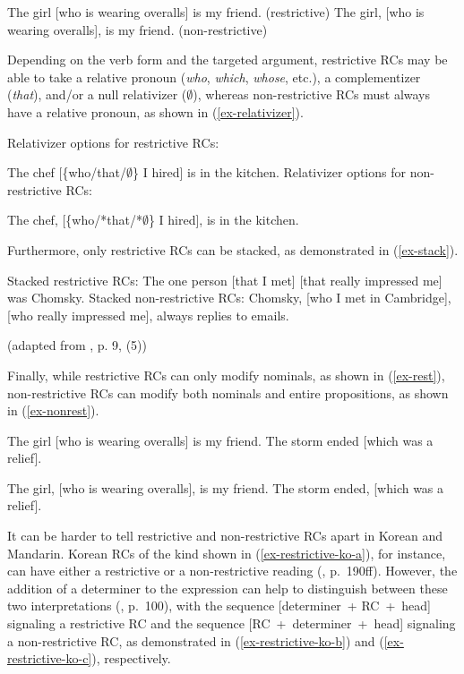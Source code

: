 \pex
\a The girl [who is wearing overalls] is my friend. (restrictive) \label{ex-prosody-a}
\a The girl, [who is wearing overalls], is my friend. (non-restrictive)\label{ex-prosody-b}
\xe

\noindent Depending on the verb form and the targeted argument, restrictive RCs may be able to take a relative pronoun (\textit{who}, \textit{which}, \textit{whose}, etc.), a complementizer (\textit{that}), and/or a null relativizer ($\emptyset$), whereas non-restrictive RCs must always have a relative pronoun, as shown in (\ref{ex-relativizer}).

\pex \label{ex-relativizer}
\a Relativizer options for restrictive RCs: \par\nobreak\vspace{5pt}
The chef [\{who/that/$\emptyset$\} I hired] is in the kitchen. \label{ex-relativizer-a}
\a Relativizer options for non-restrictive RCs: \par\nobreak\vspace{5pt}
The chef, [\{who/*that/*$\emptyset$\} I hired], is in the kitchen. \label{ex-relativizer-b}
\xe

\noindent Furthermore, only restrictive RCs can be stacked, as demonstrated in (\ref{ex-stack}).

\pex \label{ex-stack}
\a Stacked restrictive RCs:\vspace{5pt}\newline\nobreak
The one person [that I met] [that really impressed me] was Chomsky.\newpage
\a Stacked non-restrictive RCs:\vspace{5pt}\newline\nobreak
\ljudge*Chomsky, [who I met in Cambridge], [who really impressed me], always replies to emails.\par\nobreak\vspace{5pt}
\hfill (adapted from \cite{radford2019}, p. 9, (5))
\xe

\noindent Finally, while restrictive RCs can only modify nominals, as shown in (\ref{ex-rest}), non-restrictive RCs can modify both nominals and entire propositions, as shown in (\ref{ex-nonrest}). 

\pex \label{ex-rest}
\a The girl [who is wearing overalls] is my friend.
\a \ljudge* The storm ended [which was a relief].
\xe 

\pex \label{ex-nonrest}
\a The girl, [who is wearing overalls], is my friend.
\a The storm ended, [which was a relief].
\xe 

It can be harder to tell restrictive and non-restrictive RCs apart in Korean and Mandarin. Korean RCs of the kind shown in (\ref{ex-restrictive-ko-a}), for instance, can have either a restrictive or a non-restrictive reading (\cite{kim1993a}, p.~190ff). However, the addition of a determiner to the expression can help to distinguish between these two interpretations (\cite{kim1997}, p.~100), with the sequence [determiner~+ RC~+~head] signaling a restrictive RC and the sequence [RC~+~determiner~+~head] signaling a non-restrictive RC, as demonstrated in (\ref{ex-restrictive-ko-b}) and (\ref{ex-restrictive-ko-c}), respectively.


